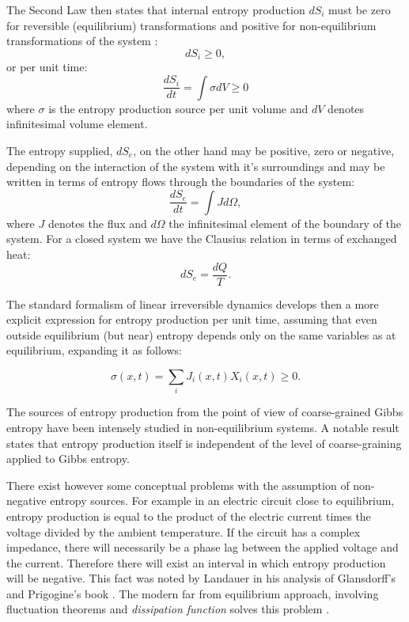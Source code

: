 \documentclass[a4paper,12pt]{article}
\begin{document}
The Second Law then states that internal entropy production $dS_i$ must be zero for reversible (equilibrium) transformations and positive for non-equilibrium transformations of the system \cite{DeGroot:2013ue}:
\begin{equation}
  dS_i \geq 0,
\end{equation}
or per unit time:
\begin{equation}
  	\frac{dS_i}{dt}=\int \sigma dV \geq 0
\end{equation}
where $\sigma$ is the entropy production source per unit volume and $dV$ denotes infinitesimal volume element.

The entropy supplied, $dS_e$, on the other hand may be positive, zero or negative, depending on the interaction of the system with it's surroundings and may be written in terms of entropy flows through the boundaries of the system:
\begin{equation}
  	\frac{dS_e}{dt}=\int J d\Omega,
\end{equation}
where $J$ denotes the flux and $d\Omega$ the infinitesimal element of the boundary of the system. For a closed system we have the Clausius relation in terms of exchanged heat:
\begin{equation}
  dS_e=\frac{dQ}{T}.
\end{equation}


The standard formalism of linear irreversible dynamics develops then a more explicit expression for entropy production per unit time, assuming that even outside equilibrium (but near) entropy depends only on the same variables as at equilibrium, expanding it as follows: 

\begin{equation}
  \sigma(x,t) = \sum_i J_i(x,t) X_i(x,t) \geq 0.
\end{equation}


The sources of entropy production from the point of view of coarse-grained Gibbs entropy have been intensely studied in non-equilibrium systems. A notable result \cite{Gilbert:1999ff, Goldstein:1998ip} states that entropy production itself is independent of the level of coarse-graining applied to Gibbs entropy.

There exist however some conceptual problems with the assumption of non-negative entropy sources.
For example in an electric circuit close to equilibrium, entropy production is equal to the product of the electric current times the voltage divided by the ambient temperature. If the circuit has a complex impedance, there will necessarily be a phase lag between the applied voltage and the current. Therefore there will exist an interval in which entropy production will be negative.
This fact was noted by Landauer in his analysis \cite{Landauer:pJ4RYJRG} of Glansdorff's and Prigogine's book \cite{Anonymous:NJxQY1gt}. The modern far from equilibrium approach, involving fluctuation theorems and \textit{dissipation function} solves this problem \cite{Evans:2241458}.
\end{document}
